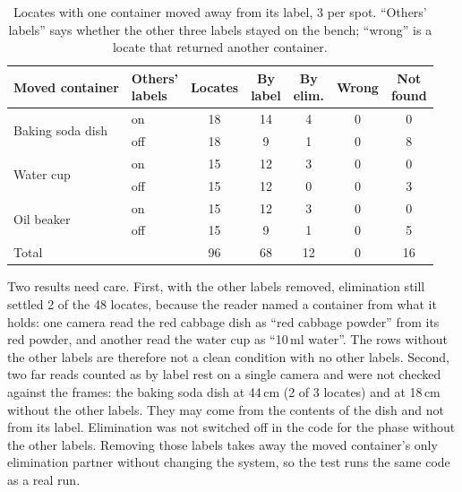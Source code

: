 \documentclass[letterpaper, 10pt, journal, twoside]{IEEEtran}}
\begin{document}
\begin{table}[t]
  \caption{Locates with one container moved away from its label, 3 per
  spot. ``Others' labels'' says whether the other three labels stayed on
  the bench; ``wrong'' is a locate that returned another container.}
  \label{tab:label_distance}
  \centering
  \footnotesize
  \setlength{\tabcolsep}{4pt}
  \begin{tabular}{@{}llccccc@{}}
    \toprule
    Moved container & \makecell{Others'\\labels} & Locates & \makecell{By\\label} & \makecell{By\\elim.} & Wrong & \makecell{Not\\found} \\
    \midrule
    \multirow{2}{*}{Baking soda dish} & on  & 18 & 14 & 4 & 0 & 0 \\
                                      & off & 18 &  9 & 1 & 0 & 8 \\
    \midrule
    \multirow{2}{*}{Water cup}        & on  & 15 & 12 & 3 & 0 & 0 \\
                                      & off & 15 & 12 & 0 & 0 & 3 \\
    \midrule
    \multirow{2}{*}{Oil beaker}       & on  & 15 & 12 & 3 & 0 & 0 \\
                                      & off & 15 &  9 & 1 & 0 & 5 \\
    \midrule
    Total                             &     & 96 & 68 & 12 & 0 & 16 \\
    \bottomrule
  \end{tabular}
\end{table}

Two results need care. First, with the other labels removed, elimination
still settled 2 of the 48 locates, because the reader named a container
from what it holds: one camera read the red cabbage dish as ``red cabbage
powder'' from its red powder, and another read the water cup as ``10\,ml
water''. The rows without the other labels are therefore not a clean
condition with no other labels. Second, two far reads counted as by label
rest on a single camera and were not checked against the frames: the
baking soda dish at 44\,cm (2 of 3 locates) and at 18\,cm without the
other labels. They may come from the contents of the dish and not from its
label. Elimination was not switched off in the code for the phase without
the other labels. Removing those labels takes away the moved container's
only elimination partner without changing the system, so the test runs the
same code as a real run.
\end{document}
